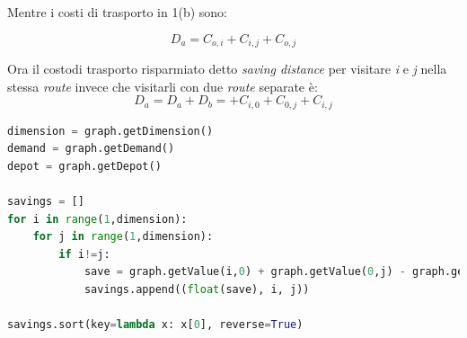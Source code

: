 \documentclass[]{article}
\begin{document}
Mentre i costi di trasporto in 1(b) sono:

\begin{equation}
D_{a} = C_{o,i} +C_{i,j} + C_{o,j} 
\end{equation}

Ora il costodi trasporto risparmiato detto \emph{saving distance} per visitare \emph{i} e \emph{j} nella stessa \emph{route} invece che visitarli con due \emph{route} separate è:
\begin{equation}
D_{a} = D_{a} +D_{b} =+ C_{i,0} +  C_{0,j} +  C_{i,j} 
\end{equation}




\begin{lstlisting}[language=Python, caption=Implementazione di Clarke and Wright con Route Merge]
dimension = graph.getDimension()
demand = graph.getDemand()
depot = graph.getDepot()

savings = []
for i in range(1,dimension):
	for j in range(1,dimension):
		if i!=j:
			save = graph.getValue(i,0) + graph.getValue(0,j) - graph.getValue(i,j)
			savings.append((float(save), i, j))

savings.sort(key=lambda x: x[0], reverse=True)



\end{lstlisting}





\end{document}
